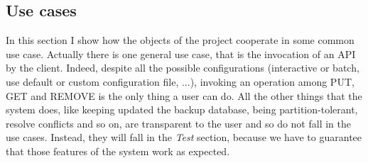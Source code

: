 \documentclass{article}
\begin{document}
\subsection{Use cases} 
In this section I show how the objects of the project cooperate in some common use case. Actually there is one general use case, that is the invocation of an API by the client. Indeed, despite all the possible configurations (interactive or batch, use default or custom configuration file, ...), invoking an operation among PUT, GET and REMOVE is the only thing a user can do. All the other things that the system does, like keeping updated the backup database, being partition-tolerant, resolve conflicts and so on, are transparent to the user and so do not fall in the use cases. Instead, they will fall in the \textit{Test} section, because we have to guarantee that those features of the system work as expected.
\end{document}
